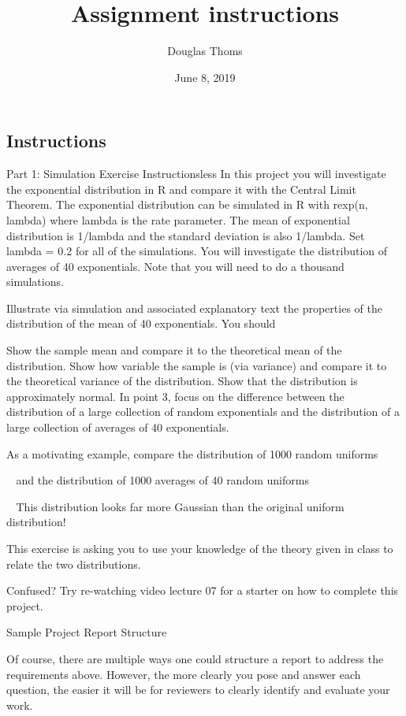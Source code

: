 \documentclass[]{article}
\title{Assignment instructions}
\author{Douglas Thoms}
\date{June 8, 2019}
\begin{document}
\maketitle

\subsection{Instructions}\label{instructions}

Part 1: Simulation Exercise Instructionsless In this project you will
investigate the exponential distribution in R and compare it with the
Central Limit Theorem. The exponential distribution can be simulated in
R with rexp(n, lambda) where lambda is the rate parameter. The mean of
exponential distribution is 1/lambda and the standard deviation is also
1/lambda. Set lambda = 0.2 for all of the simulations. You will
investigate the distribution of averages of 40 exponentials. Note that
you will need to do a thousand simulations.

Illustrate via simulation and associated explanatory text the properties
of the distribution of the mean of 40 exponentials. You should

Show the sample mean and compare it to the theoretical mean of the
distribution. Show how variable the sample is (via variance) and compare
it to the theoretical variance of the distribution. Show that the
distribution is approximately normal. In point 3, focus on the
difference between the distribution of a large collection of random
exponentials and the distribution of a large collection of averages of
40 exponentials.

As a motivating example, compare the distribution of 1000 random
uniforms

 and the distribution of 1000 averages of 40 random uniforms

 This distribution looks far more Gaussian than the original uniform
distribution!

This exercise is asking you to use your knowledge of the theory given in
class to relate the two distributions.

Confused? Try re-watching video lecture 07 for a starter on how to
complete this project.

Sample Project Report Structure

Of course, there are multiple ways one could structure a report to
address the requirements above. However, the more clearly you pose and
answer each question, the easier it will be for reviewers to clearly
identify and evaluate your work.
\end{document}
